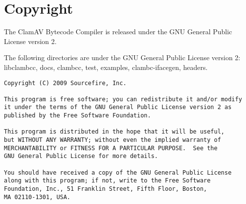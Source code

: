 \chapter{Copyright}

The ClamAV Bytecode Compiler is released under the GNU General Public License
version 2.

The following directories are under the GNU General Public License version 2:
libclambcc, docs, clambcc, test, examples, clambc-ifacegen, headers.

{\footnotesize
\begin{verbatim}
Copyright (C) 2009 Sourcefire, Inc.

This program is free software; you can redistribute it and/or modify
it under the terms of the GNU General Public License version 2 as
published by the Free Software Foundation.

This program is distributed in the hope that it will be useful,
but WITHOUT ANY WARRANTY; without even the implied warranty of
MERCHANTABILITY or FITNESS FOR A PARTICULAR PURPOSE.  See the
GNU General Public License for more details.

You should have received a copy of the GNU General Public License
along with this program; if not, write to the Free Software
Foundation, Inc., 51 Franklin Street, Fifth Floor, Boston,
MA 02110-1301, USA.
\end{verbatim}
}

